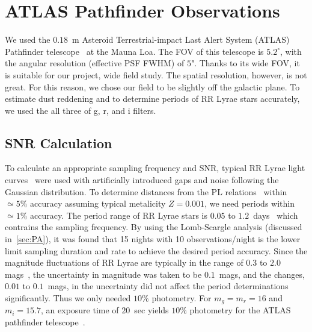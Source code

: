 \documentclass[aps,prb,twocolumn,superscriptaddress]{revtex4-1}
\begin{document}

\section{ATLAS Pathfinder Observations}


We used the $0.18$~m Asteroid Terrestrial-impact Last Alert System (ATLAS) Pathfinder telescope~\citep{fallingstar} at the Mauna Loa. The FOV of this telescope is $5.2^{\circ}$, with the angular resolution (effective PSF FWHM) of $5$". Thanks to its wide FOV, it is suitable for our project, wide field study. The spatial resolution, however, is not great. For this reason, we chose our field to be slightly off the galactic plane. To estimate dust reddening and to determine periods of RR Lyrae stars accurately, we used the all three of g, r, and i filters.



\subsection{SNR Calculation}\label{sec:SNR}

To calculate an appropriate sampling frequency and SNR, typical RR Lyrae light curves~\cite{RRLyrae} were used with artificially introduced gaps and noise following the Gaussian distribution. To determine distances from the PL relations~\citep{PL} within $\simeq5\%$ accuracy assuming typical metalicity $Z=0.001$, we need periods within $\simeq1\%$ accuracy. The period range of RR Lyrae stars is $0.05$ to $1.2$~days~\cite{Astro} which contrains the sampling frequency. By using the Lomb-Scargle analysis (discussed in~\cref{sec:PA}), it was found that 15 nights with 10 observations/night is the lower limit sampling duration and rate to achieve the desired period accuracy. Since the magnitude fluctuations of RR Lyrae are typically in the range of $0.3$ to $2.0$ mags~\cite{AAVSO}, the uncertainty in magnitude was taken to be $0.1$~mags, and the changes, $0.01$ to $0.1$~mags, in the uncertainty did not affect the period determinations significantly. Thus we only needed $10\%$ photometry. For $m_g = m_r = 16$ and $m_i = 15.7$, an exposure time of $20$~sec yields $10\%$ photometry for the ATLAS pathfinder telescope~\citep{fallingstar}.

\end{document}
